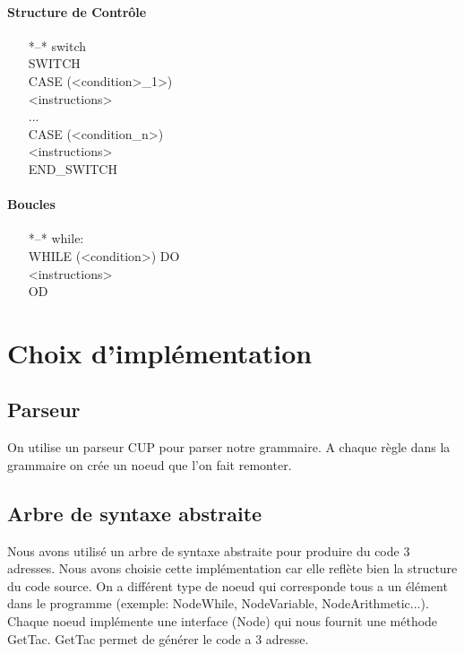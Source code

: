 \documentclass[10pt,a4paper]{report}
\begin{document}
\paragraph{Structure de Contrôle}
\begin{itemize}
\item[*--*]switch\:
	\\SWITCH
	\\ CASE (<condition>\_1>)
	\\	<instructions>
	\\...
	\\CASE (<condition\_n>)
	\\	<instructions>
	\\END\_SWITCH
\end{itemize}

\paragraph{Boucles}
\begin{itemize}

\item[*--*]while:
	\\WHILE (<condition>) DO
		\\<instructions>
	\\OD

\end{itemize}

\section{Choix d'implémentation}


\subsection{Parseur}
On utilise un parseur CUP pour parser notre grammaire.
A chaque règle dans la grammaire on crée un noeud que l'on fait remonter.



\subsection{Arbre de syntaxe abstraite}

Nous avons utilisé un arbre de syntaxe abstraite pour produire du code 3 adresses.
Nous avons choisie cette implémentation car elle reflète bien la structure du code source.
On a différent type de noeud qui corresponde tous a un élément dans le programme (exemple: NodeWhile, NodeVariable, NodeArithmetic...).
Chaque noeud implémente une interface (Node) qui nous fournit une méthode GetTac.
GetTac permet de générer le code a 3 adresse.
\end{document}
